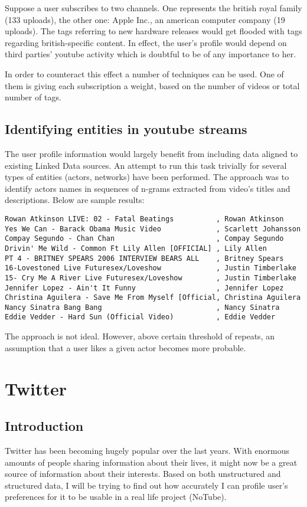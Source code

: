 \documentclass{article}
\begin{document}
Suppose a user subscribes to two channels. One represents the british royal
family (133 uploads), the other one: Apple Inc., an american computer company
(19 uploads). The tags referring to new hardware releases would get flooded with
tags regarding british-specific content. In effect, the user's profile would
depend on third parties' youtube activity which is doubtful to be of any
importance to her.

In order to counteract this effect a number of techniques can be used. One of
them is giving each subscription a weight, based on the number of videos or
total number of tags.

\subsection{Identifying entities in youtube streams}
The user profile information would largely benefit from including data aligned
to existing Linked Data sources. An attempt to run this task trivially for
several types of entities (actors, networks) have been performed. The approach
was to identify actors names in sequences of n-grams extracted from video's
titles and descriptions. Below are sample results:

\begin{verbatim}
Rowan Atkinson LIVE: 02 - Fatal Beatings          , Rowan Atkinson
Yes We Can - Barack Obama Music Video             , Scarlett Johansson
Compay Segundo - Chan Chan                        , Compay Segundo
Drivin' Me Wild - Common Ft Lily Allen [OFFICIAL] , Lily Allen
PT 4 - BRITNEY SPEARS 2006 INTERVIEW BEARS ALL    , Britney Spears
16-Lovestoned Live Futuresex/Loveshow             , Justin Timberlake
15- Cry Me A River Live Futuresex/Loveshow        , Justin Timberlake
Jennifer Lopez - Ain't It Funny                   , Jennifer Lopez
Christina Aguilera - Save Me From Myself [Official, Christina Aguilera
Nancy Sinatra Bang Bang                           , Nancy Sinatra
Eddie Vedder - Hard Sun (Official Video)          , Eddie Vedder
\end{verbatim}

The approach is not ideal. However, above certain threshold of repeats, an
assumption that a user likes a given actor becomes more probable.


\newpage
\section{Twitter}

\subsection{Introduction}
Twitter has been becoming hugely popular over the last years. With enormous amounts of people sharing information about their lives, it might now be a great source of information about their interests. Based on both unstructured and structured data, I will be trying to find out how accurately I can profile user's preferences for it to be usable in a real life project (NoTube).
\end{document}
